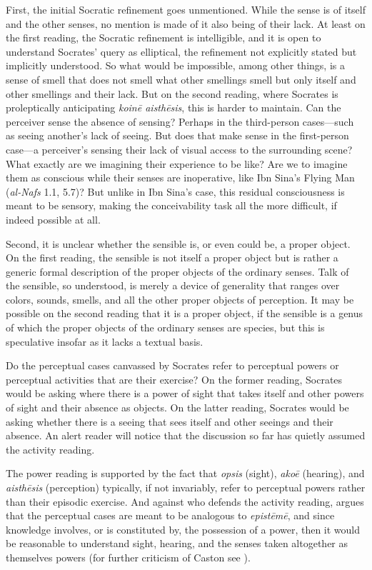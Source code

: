 First, the initial Socratic refinement goes unmentioned. While the sense is of itself and the other senses, no mention is made of it also being of their lack. At least on the first reading, the Socratic refinement is intelligible, and it is open to understand Socrates' query as elliptical, the refinement not explicitly stated but implicitly understood. So what would be impossible, among other things, is a sense of smell that does not smell what other smellings smell but only itself and other smellings and their lack. But on the second reading, where Socrates is proleptically anticipating \emph{koinē aisthēsis}, this is harder to maintain. Can the perceiver sense the absence of sensing? Perhaps in the third-person cases—such as seeing another's lack of seeing. But does that make sense in the first-person case—a perceiver's sensing their lack of visual access to the surrounding scene? What exactly are we imagining their experience to be like? Are we to imagine them as conscious while their senses are inoperative, like Ibn Sina's Flying Man (\emph{al-Nafs} 1.1, 5.7)? But unlike in Ibn Sina's case, this residual consciousness is meant to be sensory, making the conceivability task all the more difficult, if indeed possible at all.

Second, it is unclear whether the sensible is, or even could be, a proper object. On the first reading, the sensible is not itself a proper object but is rather a generic formal description of the proper objects of the ordinary senses. Talk of the sensible, so understood, is merely a device of generality that ranges over colors, sounds, smells, and all the other proper objects of perception. It may be possible on the second reading that it is a proper object, if the sensible is a genus of which the proper objects of the ordinary senses are species, but this is speculative insofar as it lacks a textual basis.

Do the perceptual cases canvassed by Socrates refer to perceptual powers or perceptual activities that are their exercise? On the former reading, Socrates would be asking where there is a power of sight that takes itself and other powers of sight and their absence as objects. On the latter reading, Socrates would be asking whether there is a seeing that sees itself and other seeings and their absence. An alert reader will notice that the discussion so far has quietly assumed the activity reading.

The power reading is supported by the fact that \emph{opsis} (sight), \emph{akoē} (hearing), and \emph{aisthēsis} (perception) typically, if not invariably, refer to perceptual powers rather than their episodic exercise. And against \citet[772–3]{caston02} who defends the activity reading, \citet[218 n18]{Tuozzo:2011aa} argues that the perceptual cases are meant to be analogous to \emph{epistēmē}, and since knowledge involves, or is constituted by, the possession of a power, then it would be reasonable to understand sight, hearing, and the senses taken altogether as themselves powers (for further criticism of Caston see \citealt{Johansen:2005hz}). 

